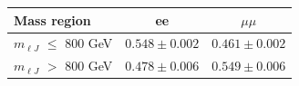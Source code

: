 \begin{table}[htp]
  \label{tab:emu_tf_boosted_RunIII2024Summer24}
  \centering
  \begin{tabular}{l | c c}
    \hline
    Mass region & ee & $\mu\mu$ \\
    \hline
    $m_{\ell J}$ $\leq$ 800 GeV & $0.548 \pm 0.002$ & $0.461 \pm 0.002$ \\
    $m_{\ell J}$ $>$ 800 GeV & $0.478 \pm 0.006$ & $0.549 \pm 0.006$ \\
    \hline
  \end{tabular}
\end{table}
